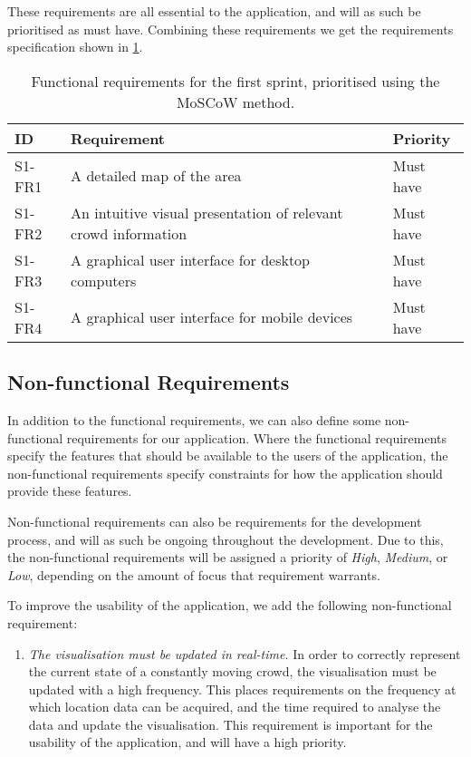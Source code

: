 These requirements are all essential to the application, and will as such be prioritised as must have. Combining these requirements we get the requirements specification shown in \cref{tab:s1_req}.

\begin{table}[htbp]
	\centering
	\begin{tabularx}{\textwidth}{lXl}
		\toprule
		\textbf{ID} & \textbf{Requirement} & \textbf{Priority} \\
		\midrule 
		\rowcolor[HTML]{EFEFEF} 
		S1-FR1 & A detailed map of the area & Must have \\
		S1-FR2 & An intuitive visual presentation of relevant crowd information & Must have \\
		\rowcolor[HTML]{EFEFEF} 
		S1-FR3 & A graphical user interface for desktop computers & Must have \\
		S1-FR4 & A graphical user interface for mobile devices & Must have \\
		\bottomrule
	\end{tabularx}
	\caption{Functional requirements for the first sprint, prioritised using the MoSCoW method.}
	\label{tab:s1_req}
\end{table}

\subsection{Non-functional Requirements} \label{ss:s1_nfreqs}
In addition to the functional requirements, we can also define some non-functional requirements for our application. Where the functional requirements specify the features that should be available to the users of the application, the non-functional requirements specify constraints for how the application should provide these features. 

Non-functional requirements can also be requirements for the development process, and will as such be ongoing throughout the development. Due to this, the non-functional requirements will be assigned a priority of \emph{High}, \emph{Medium}, or \emph{Low}, depending on the amount of focus that requirement warrants. 

To improve the usability of the application, we add the following non-functional requirement:

\begin{enumerate}
    \item \emph{The visualisation must be updated in real-time.} In order to correctly represent the current state of a constantly moving crowd, the visualisation must be updated with a high frequency. This places requirements on the frequency at which location data can be acquired, and the time required to analyse the data and update the visualisation. This requirement is important for the usability of the application, and will have a high priority.
\end{enumerate}

